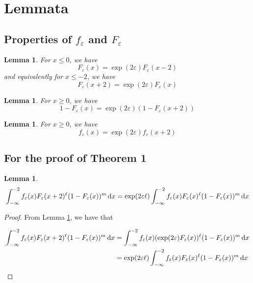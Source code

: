 \documentclass{article}
\newtheorem{lemma}[theorem]{Lemma}
\renewcommand{\epsilon}{\varepsilon}
\newcommand{\1}{\langle 1 \rangle}
\newcommand{\2}{\langle 2 \rangle}
\begin{document}
\appendix

\section{Lemmata}

\subsection{Properties of $f_\epsilon$ and $F_\epsilon$}

\begin{lemma} 
    \label{lemma:F_equality_neg}
    For $x \leq 0$, we have 
    \[F_\epsilon(x) = \exp(2\epsilon)F_\epsilon(x - 2)\]
    and equivalently for $x \leq -2$, we have 
    \[F_\epsilon(x + 2) = \exp(2\epsilon)F_\epsilon(x)\]
\end{lemma}

\begin{lemma}
    \label{lemma:F_equality_pos}
    For $x \geq 0$, we have \[1 - F_{\epsilon}(x) = \exp(2\epsilon) (1 - F_\epsilon(x + 2))\]
\end{lemma}

\begin{lemma}
    \label{lemma:f_equality}
    For $x \geq 0$, we have
    \[f_\epsilon(x) = \exp(2\epsilon) f_\epsilon(x + 2) \]
\end{lemma}

\subsection{For the proof of Theorem 1}
\begin{lemma} 
    \label{lemma:sl_tight_minus_infty} 
    \[\int_{-\infty}^{-2} f_{\epsilon}(x) F_{\epsilon}(x + 2)^\ell (1 - F_{\epsilon}(x))^m \dif x = \exp(2 \epsilon \ell) \int_{-\infty}^{-2} f_{\epsilon}(x) F_{\epsilon}(x)^\ell (1 - F_{\epsilon}(x))^m \dif x\]
\end{lemma}

\begin{proof}
    From Lemma \ref{lemma:F_equality_neg}, we have that 

    \begin{align*}
        \int_{-\infty}^{-2} f_{\epsilon}(x) F_{\epsilon}(x + 2)^\ell (1 - F_{\epsilon}(x))^m \dif x &= \int_{-\infty}^{-2} f_{\epsilon}(x) (\exp(2\epsilon) F_{\epsilon}(x))^\ell (1 - F_{\epsilon}(x))^m \dif x \\
        &= \exp(2\epsilon \ell) \int_{-\infty}^{-2} f_{\epsilon}(x) F_{\epsilon}(x)^\ell (1 - F_{\epsilon}(x))^m \dif x
    \end{align*}
\end{proof}
\end{document}
